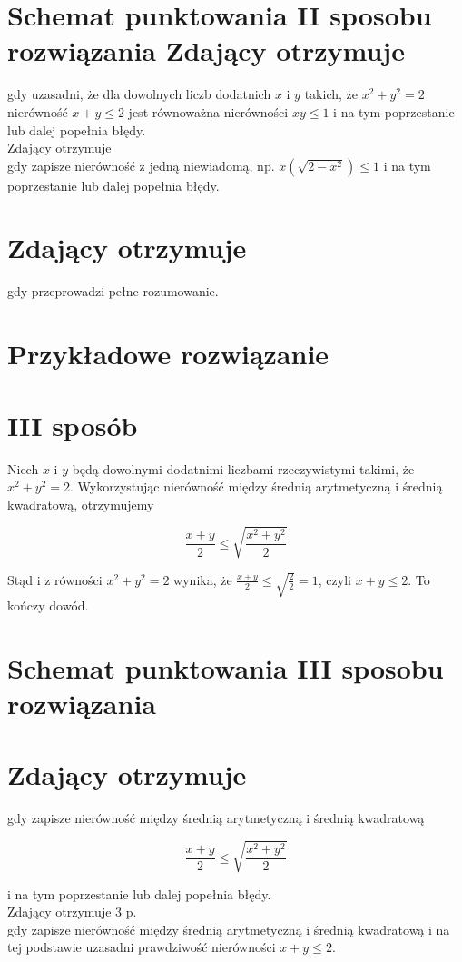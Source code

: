 \documentclass[10pt]{article}
\begin{document}
\section*{Schemat punktowania II sposobu rozwiązania Zdający otrzymuje}
gdy uzasadni, że dla dowolnych liczb dodatnich $x$ i $y$ takich, że $x^{2}+y^{2}=2$ nierówność $x+y \leq 2$ jest równoważna nierówności $x y \leq 1$ i na tym poprzestanie lub dalej popełnia błędy.\\
Zdający otrzymuje\\
gdy zapisze nierówność z jedną niewiadomą, np. $x\left(\sqrt{2-x^{2}}\right) \leq 1$ i na tym poprzestanie lub dalej popełnia błędy.

\section*{Zdający otrzymuje}
gdy przeprowadzi pełne rozumowanie.

\section*{Przykładowe rozwiązanie}
\section*{III sposób}
Niech $x$ i $y$ będą dowolnymi dodatnimi liczbami rzeczywistymi takimi, że $x^{2}+y^{2}=2$. Wykorzystując nierówność między średnią arytmetyczną i średnią kwadratową, otrzymujemy

$$
\frac{x+y}{2} \leq \sqrt{\frac{x^{2}+y^{2}}{2}}
$$

Stąd i z równości $x^{2}+y^{2}=2$ wynika, że $\frac{x+y}{2} \leq \sqrt{\frac{2}{2}}=1$, czyli $x+y \leq 2$. To kończy dowód.

\section*{Schemat punktowania III sposobu rozwiązania}
\section*{Zdający otrzymuje}
gdy zapisze nierówność między średnią arytmetyczną i średnią kwadratową

$$
\frac{x+y}{2} \leq \sqrt{\frac{x^{2}+y^{2}}{2}}
$$

i na tym poprzestanie lub dalej popełnia błędy.\\
Zdający otrzymuje 3 p.\\
gdy zapisze nierówność między średnią arytmetyczną i średnią kwadratową i na tej podstawie uzasadni prawdziwość nierówności $x+y \leq 2$.
\end{document}
